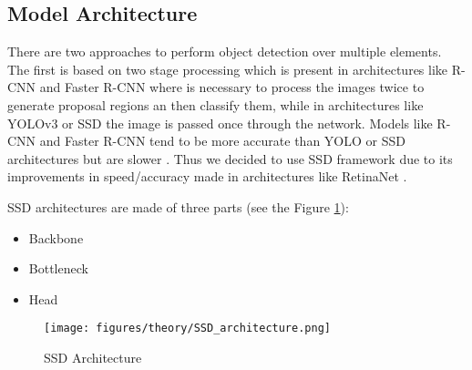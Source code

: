 \documentclass{IEEEtran}
\begin{document}
\subsection{Model Architecture}
There are two approaches to perform object detection over multiple elements. The
first is based on two stage processing which is present in architectures like
R-CNN \cite{detectors:R-CNN} and Faster R-CNN \cite{detectors:Faster_R-CNN}
where is necessary to process the images twice to generate proposal regions an
then classify them, while in architectures like YOLOv3 \cite{detectors:yolov3}
or SSD \cite{detectors:SSD} the image is passed once through the network. Models
like R-CNN and Faster R-CNN tend to be more accurate than YOLO or SSD
architectures but are slower \cite{detectors:comparison}. Thus we decided to use
SSD framework due to its improvements in speed/accuracy made in architectures
like RetinaNet \cite{detectors:retinanet}.\par

SSD architectures are made of three parts (see the Figure
\ref{fig:SSD_architecture}):
\begin{itemize}
    \item Backbone
    \item Bottleneck
    \item Head
\end{itemize}
\begin{figure}[ht]
    \centering
    \texttt{[image: figures/theory/SSD\_architecture.png]}
    \caption{SSD Architecture}
    \label{fig:SSD_architecture}
\end{figure}
\par
\end{document}
